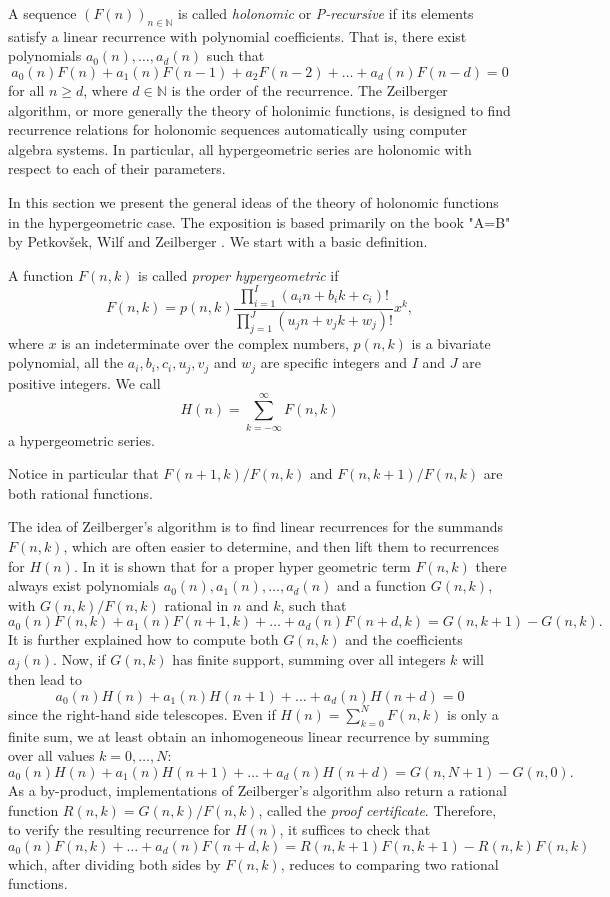 \documentclass{amsart}
\numberwithin{equation}{section}
\newcommand*{\N}{\mathbb{N}}
\begin{document}
A sequence $(F(n))_{n\in\N}$ is called \textit{holonomic} or \textit{P-recursive} if its elements satisfy a linear recurrence with polynomial coefficients. That is, there exist  polynomials $a_0(n),\dots,a_d(n)$ such that
\[a_0(n)F(n)+a_1(n)F(n-1)+a_2F(n-2)+\dots +a_d(n)F(n-d)=0\]
for all $n\geq d$, where $d\in \N$ is the order of the recurrence.
The Zeilberger algorithm, or more generally the theory of holonimic functions, is designed to find recurrence relations for holonomic sequences automatically using computer algebra systems. In particular, all hypergeometric series are holonomic with respect to each of their parameters. 

In this section we present the general ideas of the theory of holonomic functions in the hypergeometric case. The exposition is based primarily on the book "A=B" by Petkovšek, Wilf and Zeilberger \cite{AB}. We start with a basic definition.
 \begin{defin}[\cite{AB}]
     A function $F(n,k)$ is called \textit{proper hypergeometric} if 
     \[F(n,k)=p(n,k)\frac{\prod_{i=1}^I(a_in+b_ik+c_i)!}{\prod_{j=1}^J(u_jn+v_jk+w_j)!}x^k,\]
     where $x$ is an indeterminate over the complex numbers, $p(n,k)$ is a bivariate polynomial, all the $a_i,b_i,c_i,u_j,v_j$ and $w_j$ are specific integers and $I$ and $J$ are positive integers. We call 
     \[H(n)=\sum_{k=-\infty}^\infty F(n,k)\] a hypergeometric series.
 \end{defin}
 \begin{rem}
     Notice in particular that $F(n+1,k)/F(n,k)$ and $F(n,k+1)/F(n,k)$ are both rational functions.
 \end{rem}
The idea of Zeilberger’s algorithm is to find linear recurrences for the summands $F(n,k)$, which are often easier to determine, and then lift them to recurrences for $H(n)$. In \cite[Thm. 6.2.1]{AB} it is shown that for a proper hyper geometric term $F(n,k)$ there always exist polynomials $a_0(n),a_1(n),\dots, a_d(n)$ and a function $G(n,k)$, with $G(n,k)/F(n,k)$ rational in $n$ and $k$, such that
\[a_0(n)F(n,k)+a_1(n)F(n+1,k)+\dots +a_d(n)F(n+d,k)=G(n,k+1)-G(n,k).\]
It is further explained how to compute both $G(n,k)$ and the coefficients $a_j(n)$. 
Now, if $G(n,k)$ has finite support, summing over all integers $k$ will then lead to
\[a_0(n)H(n)+a_1(n)H(n+1)+\dots +a_d(n)H(n+d)=0\]
since the right-hand side telescopes. Even if $H(n)=\sum_{k=0}^N F(n,k)$ is only a finite sum, we at least obtain an inhomogeneous linear recurrence by summing over all values $k=0,\dots,N$:
\[a_0(n)H(n)+a_1(n)H(n+1)+\dots +a_d(n)H(n+d)=G(n,N+1)-G(n,0).\]
As a by-product, implementations of Zeilberger's algorithm also return a rational function $R(n,k)=G(n,k)/F(n,k)$, called the \textit{proof certificate}. Therefore, to verify the resulting recurrence for $H(n)$, it suffices to check that
\[a_0(n)F(n,k)+\dots +a_d(n)F(n+d,k)=R(n,k+1)F(n,k+1)-R(n,k)F(n,k)\]
which, after dividing both sides by $F(n,k)$,  reduces to comparing two rational functions.
\end{document}

